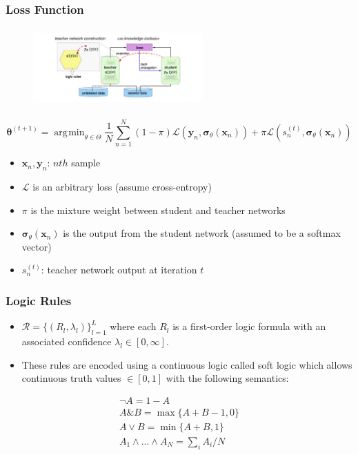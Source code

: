 \documentclass{beamer}
\DeclareMathOperator*{\argmin}{\arg\!\min}
\begin{document}
\begin{frame}
\frametitle{Loss Function}
\begin{figure}
	\begin{center}
		\includegraphics[width=6.5cm, height=3cm]{teacher_dnn}
	\end{center}
\end{figure}
\begin{equation}
\boldsymbol{\theta}^{(t + 1)} = \argmin_{\theta \in \Theta} \frac{1}{N} \sum_{n = 1}^{N} (1 - \pi) \mathcal{L}(\textbf{y}_n, \boldsymbol{\sigma}_{\theta}(\textbf{x}_{n})) + \pi \mathcal{L}(s_n^{(t)}, \boldsymbol{\sigma}_{\theta}(\textbf{x}_n))
\end{equation}
\begin{itemize}
	\item  $\textbf{x}_n, \textbf{y}_n$: $nth$ sample
	\item $\mathcal{L}$ is an arbitrary loss (assume cross-entropy)
	\item $\pi$ is the mixture weight between student and teacher networks
	\item $\boldsymbol{\sigma}_{\theta}(\textbf{x}_n)$ is the output from the student network (assumed to be a softmax vector)
	\item $s_n^{(t)}$: teacher network output at iteration $t$
\end{itemize}
\end{frame}

\begin{frame}
\frametitle{Logic Rules}
\begin{itemize}
\item $\mathcal{R} = \{(R_l, \lambda_l) \}_{l = 1}^L$ where each $R_l$ is a first-order logic formula with an associated confidence $\lambda_l \in [0, \infty]$.
\item These rules are encoded using a continuous logic called soft logic which allows continuous truth values $\in [0, 1]$ with the following semantics:
\end{itemize}

\begin{equation}
\begin{gathered}
\neg A = 1 - A\\
A \& B = \max\{A + B - 1, 0\}\\
A \lor B = \min\{A + B, 1\}\\
A_1 \land ... \land A_N = \sum_i A_i / N
\end{gathered}
\end{equation}
\end{frame}
\end{document}
